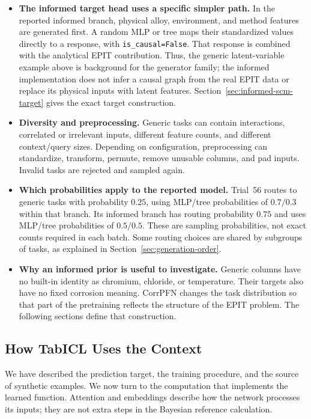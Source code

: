 \documentclass[11pt]{article}
\newenvironment{notes}
  {\begin{itemize}\setlength{\itemsep}{0.45em}\setlength{\parsep}{0pt}}
  {\end{itemize}}
\begin{document}
\begin{notes}
    \item \textbf{The informed target head uses a specific simpler path.}
    In the reported informed branch, physical alloy, environment,
    and method features are generated first. A random MLP or tree
    maps their standardized values directly to a response, with
    \texttt{is\_causal=False}. That response is combined with the
    analytical EPIT contribution. Thus, the generic latent-variable
    example above is background for the generator family; the
    informed implementation does not infer a causal graph from
    the real EPIT data or replace its physical inputs with latent
    features. Section~\ref{sec:informed-scm-target} gives the
    exact target construction.

    \item \textbf{Diversity and preprocessing.} Generic tasks can
    contain interactions, correlated or irrelevant inputs,
    different feature counts, and different context/query sizes.
    Depending on configuration, preprocessing can standardize,
    transform, permute, remove unusable columns, and pad inputs.
    Invalid tasks are rejected and sampled again.

    \item \textbf{Which probabilities apply to the reported model.}
    Trial~56 routes to generic tasks with probability \(0.25\),
    using MLP/tree probabilities of \(0.7/0.3\) within that branch.
    Its informed branch has routing probability \(0.75\) and
    uses MLP/tree probabilities of \(0.5/0.5\).
    These are sampling probabilities, not exact counts required
    in each batch. Some routing choices are shared by subgroups
    of tasks, as explained in Section~\ref{sec:generation-order}.

    \item \textbf{Why an informed prior is useful to investigate.}
    Generic columns have no built-in identity as chromium,
    chloride, or temperature. Their targets also have no fixed
    corrosion meaning. CorrPFN changes the task distribution
    so that part of the pretraining reflects the structure of the
    EPIT problem. The following sections define that construction.
\end{notes}

\subsection{How TabICL Uses the Context}
\label{sec:tabicl-context-processing}

We have described the prediction target, the training procedure,
and the source of synthetic examples. We now turn to the
computation that implements the learned function. Attention and
embeddings describe how the network processes its inputs; they
are not extra steps in the Bayesian reference calculation.
\end{document}
